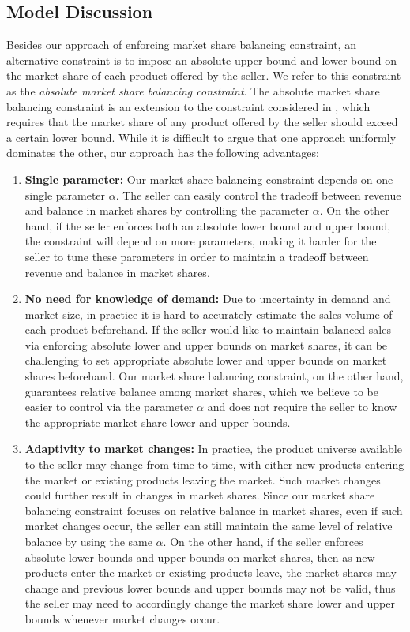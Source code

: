 \documentclass[mnsc,non-blindrev]{informs3}
\theoremstyle{definition}
\begin{document}
{ 

\subsection{Model Discussion}\label{sec:model_discussion}

Besides our approach of enforcing market share balancing constraint, an alternative constraint is to impose an absolute upper bound and lower bound on the market share of each product offered by the seller. We refer to this constraint as the {\it absolute market share balancing constraint}. The absolute market share balancing constraint is an extension to the constraint considered in \cite{zhu2024unified}, which requires that the market share of any product offered by the seller should exceed a certain lower bound. While it is difficult to argue that one approach uniformly dominates the other, our approach has the following advantages:

\begin{enumerate}

\item {\bf Single parameter:} Our market share balancing constraint depends on one single parameter $\alpha$. The seller can easily control the tradeoff between revenue and balance in market shares by controlling the parameter $\alpha$. On the other hand, if the seller enforces both an absolute lower bound and upper bound, the constraint will depend on more parameters, making it harder for the seller to tune these parameters in order to maintain a tradeoff between revenue and balance in market shares.

\item {\bf No need for knowledge of demand:} Due to uncertainty in demand and market size, in practice it is hard to accurately estimate the sales volume of each product beforehand. If the seller would like to maintain balanced sales via enforcing absolute lower and upper bounds on market shares, it can be challenging to set appropriate absolute lower and upper bounds on market shares beforehand. Our market share balancing constraint, on the other hand, guarantees relative balance among market shares, which we believe to be easier to control via the parameter $\alpha$ and does not require the seller to know the appropriate market share lower and upper bounds.

\item {\bf Adaptivity to market changes:} In practice, the product universe available to the seller may change from time to time, with either new products entering the market or existing products leaving the market. Such market changes could further result in changes in market shares. Since our market share balancing constraint focuses on relative balance in market shares, even if such market changes occur, the seller can still maintain the same level of relative balance by using the same $\alpha$. On the other hand, if the seller enforces absolute lower bounds and upper bounds on market shares, then as new products enter the market or existing products leave, the market shares may change and previous lower bounds and upper bounds may not be valid, thus the seller may need to accordingly change the market share lower and upper bounds whenever market changes occur.


\end{enumerate}}
\end{document}
